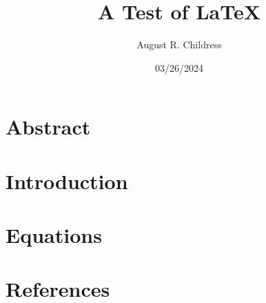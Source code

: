 \documentclass{article}
\author{August R. Childress}
\title{A Test of LaTeX}
\date{03/26/2024}
\begin{document}
\maketitle

\section{Abstract}


\section{Introduction}


\section{Equations}




\section{References}


\end{document}
